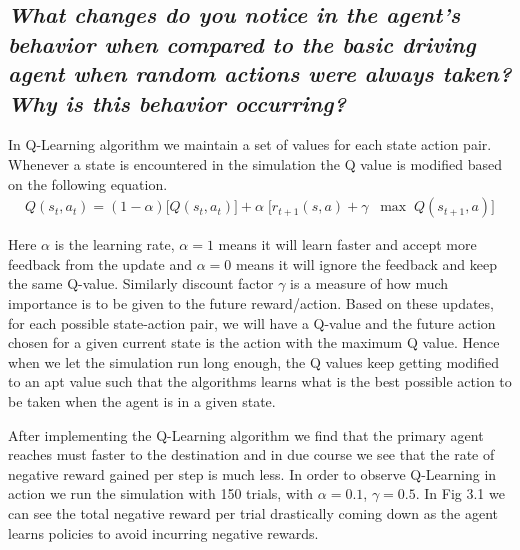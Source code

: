 \documentclass[paper=a4, fontsize=11pt]{scrartcl}
\numberwithin{equation}{section}		%
\numberwithin{figure}{section}			%
\numberwithin{table}{section}				%
\begin{document}
\subsection{ \textit{What changes do you notice in the agent's behavior when compared to the basic driving agent when random actions were always taken? Why is this behavior occurring?}}

In Q-Learning algorithm we maintain a set of values for each state action pair. Whenever a state is encountered in the simulation the Q value is modified based on the following equation.
	\begin{align}\nonumber
	Q (s_t,a_t) =  (1  - \alpha)  \bigg[Q(s_t, a_t)  \bigg]+  \alpha \; \bigg[ r_{t+1}(s,a) + \gamma   \; \;  \max \; Q(s_{t+1}, a )   \bigg]
	\end{align}
	
Here $\alpha$ is the learning rate, $\alpha = 1$ means it will learn faster and accept more feedback from the update and $\alpha =0$ means it will ignore the feedback and keep the same Q-value. Similarly discount factor $\gamma$ is a measure of how much importance is to be given to the future reward/action.  Based on these updates, for each possible state-action pair, we will have a Q-value and the future action chosen for a given current state is the action with the maximum Q value. Hence when we let the simulation run long enough, the Q values keep getting modified to an apt value such that the algorithms learns what is the best possible action to be taken when the agent is in a given state.

After implementing the Q-Learning algorithm we find that the primary agent reaches must faster to the destination and in due course we see that the rate of negative reward gained per step is much less. In order to observe Q-Learning in action we run the simulation with 150 trials, with $\alpha=0.1$, $\gamma=0.5$. In Fig 3.1 we can see the total negative reward per trial drastically coming down as the agent learns policies to avoid incurring negative rewards. 
\end{document}

